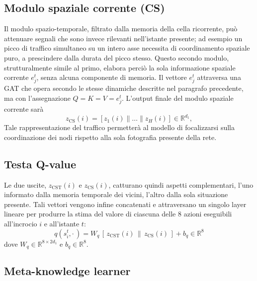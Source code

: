 \subsection{Modulo spaziale corrente (CS)}
\label{subsec:cs-module}

Il modulo spazio-temporale, filtrato dalla memoria della cella ricorrente,
può attenuare segnali che sono invece rilevanti nell'istante
presente; ad esempio un picco di traffico simultaneo su un intero asse
necessita di coordinamento spaziale puro, a prescindere dalla durata del picco stesso.
Questo secondo modulo, strutturalmente simile al primo,
elabora perciò la sola informazione spaziale corrente $e_j^t$, senza alcuna
componente di memoria.
Il vettore $e_j^t$ attraversa una GAT che opera secondo le stesse dinamiche descritte
nel paragrafo precedente, ma con l'assegnazione $Q=K=V=e_j^t$.
L'output finale del modulo spaziale corrente sarà
\begin{equation}
  z_{\mathrm{CS}}(i) = [z_1(i) \| \dots \| z_H(i)] \in \mathbb{R}^{d_1} ,
  \label{eq:stgat-cs-output}
\end{equation}
Tale rappresentazione del traffico permetterà al modello di focalizzarsi sulla coordinazione dei nodi rispetto alla sola fotografia presente della rete.

\subsection{Testa Q-value}
\label{subsec:q-head}

Le due uscite, $z_{\mathrm{CST}}(i)$ e $z_{\mathrm{CS}}(i)$, catturano
quindi aspetti complementari, l'uno informato dalla memoria temporale dei
vicini, l'altro dalla sola situazione presente. Tali vettori vengono infine concatenati e attraversano un singolo layer lineare per
produrre la stima del valore di ciascuna delle 8 azioni eseguibili all'incrocio $i$ e all'istante $t$:
\begin{equation}
  q(s_i^t, \cdot\,) = W_q\,[\,z_{\mathrm{CST}}(i) \,\|\, z_{\mathrm{CS}}(i)\,] + b_q \in \mathbb{R}^{8}
\end{equation}
dove $W_q \in \mathbb{R}^{8 \times 2 d_1}$ e $b_q \in \mathbb{R}^{8}$.

\subsection{Meta-knowledge learner}

